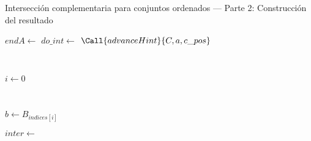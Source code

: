 \begin{algorithm}
\caption{Intersección complementaria para conjuntos ordenados — Parte 2: Construcción del resultado}
\begin{algorithmic}[1]
\State $endA \gets$ 
        \State $do\_int \gets$ 
        \State $\Call{advanceHint}{C, a, c\_pos}$
    

    \ 
    
        \State $i \gets 0$
                
    \



            \State $b \gets B_{indices[i]}$

                \State $inter \gets$ 
                    \State {}
                \EndIf
            \EndIf
        
    
        \EndFor
   \
        
        \Else
            \State {}
        \EndIf
        
    \
    

    \EndFor
            
    \
    
    \State {}
\EndFunction
\end{algorithmic}
\end{algorithm}